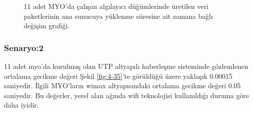 \begin{figure}[htbp]
\centering
{}



\caption{11 adet MYO'da çalışan algılayıcı düğümlerinde üretilen veri paketlerinin ana sunucuya yüklenme süresine ait zamana bağlı değişim grafiği.}
\label{fig:4-34}
\end{figure}
\newpage
\subsubsection{Senaryo:2}\label{senaryo2}

11 adet \gls{myo}'da kurulmuş olan UTP altyapılı haberleşme sisteminde gözlemlenen ortalama gecikme değeri Şekil \ref{fig:4-35}’te görüldüğü üzere yaklaşık 0.00015 saniyedir. İlgili MYO'ların \gls{wimax} altyapısındaki ortalama gecikme değeri 0.05 saniyedir. 
Bu değerler, yerel alan ağında \gls{wifi} teknolojisi kullanıldığı duruma göre daha iyidir. 

